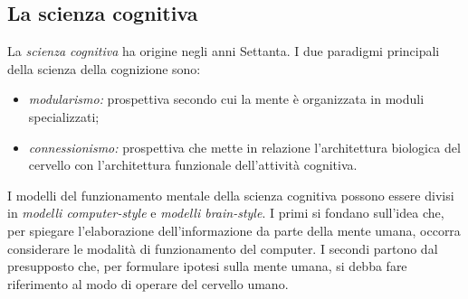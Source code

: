 \documentclass[a4paper]{article}
\begin{document}
\subsection{La scienza cognitiva}
La \emph{scienza cognitiva} ha origine negli anni Settanta.
I due paradigmi principali della scienza della cognizione sono:
\begin{itemize}
    \item \emph{modularismo:} prospettiva secondo cui la mente è organizzata in moduli specializzati;
    \item \emph{connessionismo:} prospettiva che mette in relazione l'architettura biologica del cervello con l'architettura funzionale dell'attività cognitiva.
\end{itemize}
I modelli del funzionamento mentale della scienza cognitiva possono essere divisi in \emph{modelli computer-style} e \emph{modelli brain-style}. I primi si fondano sull'idea che, per spiegare l'elaborazione dell'informazione da parte della mente umana, occorra considerare le modalità di funzionamento del computer. I secondi partono dal presupposto che, per formulare ipotesi sulla mente umana, si debba fare riferimento al modo di operare del cervello umano.
\end{document}
